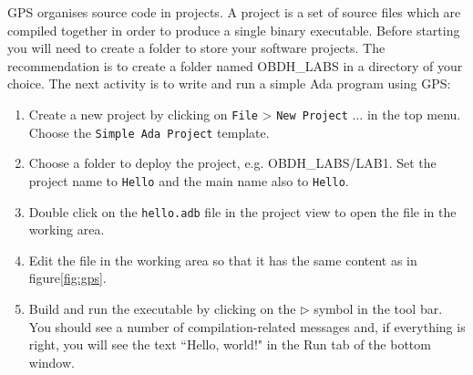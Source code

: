 GPS organises source code in projects. A project is a set of source files which are compiled together in order to produce a single binary executable. 
Before starting you will need to create a folder to store your software projects. The recommendation is to create a folder named OBDH\_LABS in a directory of your choice.
The next activity is to write and run a simple Ada program using GPS:
\begin{enumerate}
\item 	Create a new project by clicking on {\tt File} > {\tt New Project} ... in the top menu. Choose the {\tt Simple Ada Project} template.
\item	Choose a folder to deploy the project, e.g. OBDH\_LABS/LAB1. Set the project name to {\tt Hello} and the main name also to {\tt Hello}.
\item	Double click on the {\tt hello.adb} file in the project view to open the file in the working area. 
\item	Edit the file in the working area so that it has the same content as in figure\ref{fig:gps}.
\item	Build and run the executable by clicking on the $\rhd$ symbol in the tool bar. You should see a number of compilation-related messages and, if everything is right, you will see the text ``Hello, world!" in the Run tab of the bottom window.
\end{enumerate}


